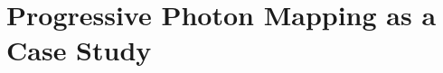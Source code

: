 \documentclass[main.tex]{subfiles}
\begin{document}
\chapter{Progressive Photon Mapping as a Case Study}
\end{document}
